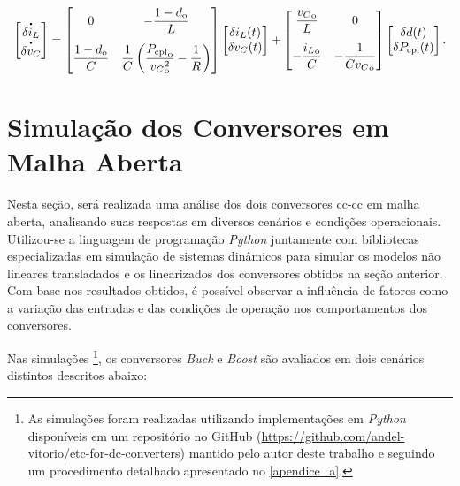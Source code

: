 \begin{equation}
  \begin{bmatrix} 
    \dt{\delta i_L} \\ \dt{\delta v_C} 
  \end{bmatrix} = 
  \begin{bmatrix} 
    \displaystyle 0 & \displaystyle -\frac{1 - d_{\mathrm{o}}}{L}  \\[12pt]\displaystyle \frac{1 - d_{\mathrm{o}}}{C} & \displaystyle \frac{1}{C}\left(\frac{{P_{\mathrm{cpl}}}_{\mathrm{o}}}{{{v_{C}}^2_{\mathrm{o}}}} - \frac{1}{R}\right) 
  \end{bmatrix} 
  \begin{bmatrix} 
    \delta i_L(t) \\ \delta v_C(t) 
  \end{bmatrix} + 
  \begin{bmatrix} 
    \displaystyle \frac{{v_C}_{\mathrm{o}}}{L} & 0 \\[12pt] 
    \displaystyle - \frac{{i_L}_{\mathrm{o}}}{C} & \displaystyle {-\frac{1}{C{v_C}_{\mathrm{o}}}} 
  \end{bmatrix}  
  \begin{bmatrix} 
    \delta d(t) \\ \delta P_{\mathrm{cpl}}(t) 
  \end{bmatrix}. \label{eq:boost_linear_system}
\end{equation}

\section{Simulação dos Conversores em Malha Aberta} \label{section:open_loop}

Nesta seção, será realizada uma análise dos dois conversores \acrshort{cc}-\acrshort{cc} em malha aberta, analisando suas respostas em diversos cenários e condições operacionais. Utilizou-se a linguagem de programação \textit{Python} juntamente com bibliotecas especializadas em simulação de sistemas dinâmicos para simular os modelos não lineares transladados e os linearizados dos conversores obtidos na seção anterior. Com base nos resultados obtidos, é possível observar a influência de fatores como a variação das entradas e das condições de operação nos comportamentos dos conversores.

Nas simulações \footnote{As simulações foram realizadas utilizando implementações em \textit{Python} disponíveis em um repositório no GitHub (\url{https://github.com/andel-vitorio/etc-for-dc-converters}) mantido pelo autor deste trabalho e seguindo um procedimento detalhado apresentado no \autoref{apendice_a}.}, os conversores \textit{Buck} e \textit{Boost} são avaliados em dois cenários distintos descritos abaixo:

